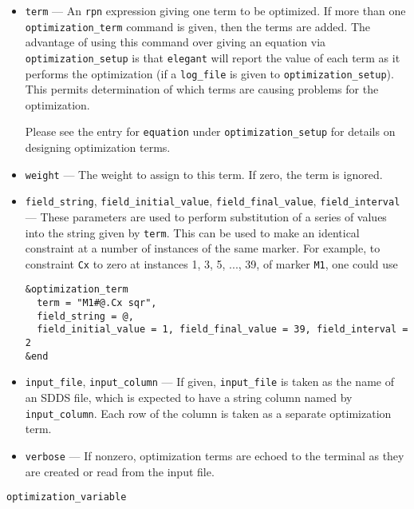 \documentclass[11pt]{article}
\begin{document}
\begin{itemize}
\item \verb|term| --- An {\tt rpn} expression giving one term to be optimized.
If more than one \verb|optimization_term| command is given, then the terms are
added.   The advantage of using this command over giving an equation via
\verb|optimization_setup| is that {\tt elegant} will report the value of
each term as it performs the optimization (if a \verb|log_file| is given to
\verb|optimization_setup|).  This permits determination of
which terms are causing problems for the optimization.

Please see the entry for {\tt equation} under {\tt optimization\_setup} for
details on designing optimization terms.

\item \verb|weight| --- The weight to assign to this term.  If zero, the term
        is ignored.


\item \verb|field_string|, \verb|field_initial_value|, \verb|field_final_value|, \verb|field_interval| --- 
  These parameters are used to perform substitution of a series of values into the string given by
  \verb|term|.  This can be used to make an identical constraint at a number of instances
  of the same marker.  For example, to constraint \verb|Cx| to zero at instances 1, 3, 5, ..., 39,
  of marker \verb|M1|, one could use
\begin{verbatim}
&optimization_term
  term = "M1#@.Cx sqr", 
  field_string = @, 
  field_initial_value = 1, field_final_value = 39, field_interval = 2
&end
\end{verbatim}

\item \verb|input_file|, \verb|input_column| --- If given, \verb|input_file| is taken as the name of an SDDS file,
  which is expected to have a string column named by \verb|input_column|.  Each row of the column is taken as
  a separate optimization term.

\item \verb|verbose| --- If nonzero, optimization terms are echoed to the terminal as they are created or read
  from the input file.

\end{itemize}

\newpage
\begin{center}{\Large\verb|optimization_variable|}\end{center}
\end{document}
